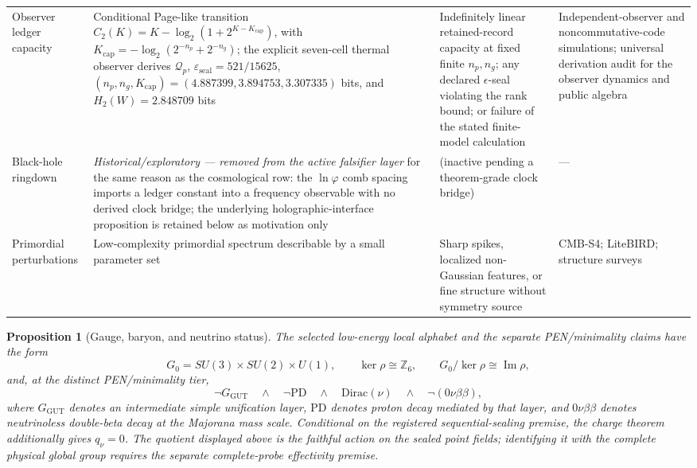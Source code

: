 \documentclass[11pt]{article}
\theoremstyle{plain}
\newtheorem{proposition}[theorem]{Proposition}
\theoremstyle{definition}
\theoremstyle{remark}
\newcommand{\SM}{SU(3)\times SU(2)\times U(1)}
\begin{document}
{\begin{longtable}{@{}>{\raggedright\arraybackslash}p{}>{\raggedright\arraybackslash}p{}>{\raggedright\arraybackslash}p{}>{\raggedright\arraybackslash}p{}@{}}
Observer ledger capacity & Conditional Page-like transition \(C_2(K)=K-\log_2(1+2^{K-K_{\mathrm{cap}}})\), with \(K_{\mathrm{cap}}=-\log_2(2^{-n_p}+2^{-n_g})\); the explicit seven-cell thermal observer derives \(\mathcal Q_p\), \(\varepsilon_{\mathrm{seal}}=521/15625\), \((n_p,n_g,K_{\mathrm{cap}})=(4.887399,3.894753,3.307335)\) bits, and \(H_2(W)=2.848709\) bits & Indefinitely linear retained-record capacity at fixed finite \(n_p,n_g\); any declared \(\epsilon\)-seal violating the rank bound; or failure of the stated finite-model calculation & Independent-observer and noncommutative-code simulations; universal derivation audit for the observer dynamics and public algebra \\
Black-hole ringdown & \emph{Historical/exploratory --- removed from the active falsifier layer} for the same reason as the cosmological row: the \(\ln\varphi\) comb spacing imports a ledger constant into a frequency observable with no derived clock bridge; the underlying holographic-interface proposition is retained below as motivation only & (inactive pending a theorem-grade clock bridge) & --- \\
Primordial perturbations & Low-complexity primordial spectrum describable by a small parameter set & Sharp spikes, localized non-Gaussian features, or fine structure without symmetry source & CMB-S4; LiteBIRD; structure surveys \\
\bottomrule
\end{longtable}
}

\begin{proposition}[Gauge, baryon, and neutrino status]
The selected low-energy local alphabet and the separate PEN/minimality claims have the form
\[
G_0=\SM,
\qquad
\ker\rho\cong\mathbb Z_6,
\qquad
G_0/\ker\rho\cong\operatorname{Im}\rho,
\]
and, at the distinct PEN/minimality tier,
\[
\neg G_{\mathrm{GUT}}
\quad\wedge\quad
\neg \mathrm{PD}
\quad\wedge\quad
\mathrm{Dirac}(\nu)
\quad\wedge\quad
\neg(0\nu\beta\beta),
\]
where \(G_{\mathrm{GUT}}\) denotes an intermediate simple unification layer, \(\mathrm{PD}\) denotes proton decay mediated by that layer, and \(0\nu\beta\beta\) denotes neutrinoless double-beta decay at the Majorana mass scale.
Conditional on the registered sequential-sealing premise, the charge theorem additionally gives \(q_\nu=0\).  The quotient displayed above is the faithful action on the sealed point fields; identifying it with the complete physical global group requires the separate complete-probe effectivity premise.
\end{proposition}
\end{document}
